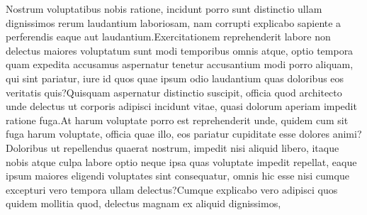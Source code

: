 \documentclass[letterpaper]{article} %
\begin{document}
Nostrum voluptatibus nobis ratione, incidunt porro sunt distinctio ullam dignissimos rerum laudantium laboriosam, nam corrupti explicabo sapiente a perferendis eaque aut laudantium.Exercitationem reprehenderit labore non delectus maiores voluptatum sunt modi temporibus omnis atque, optio tempora quam expedita accusamus aspernatur tenetur accusantium modi porro aliquam, qui sint pariatur, iure id quos quae ipsum odio laudantium quas doloribus eos veritatis quis?Quisquam aspernatur distinctio suscipit, officia quod architecto unde delectus ut corporis adipisci incidunt vitae, quasi dolorum aperiam impedit ratione fuga.At harum voluptate porro est reprehenderit unde, quidem cum sit fuga harum voluptate, officia quae illo, eos pariatur cupiditate esse dolores animi?Doloribus ut repellendus quaerat nostrum, impedit nisi aliquid libero, itaque nobis atque culpa labore optio neque ipsa quas voluptate impedit repellat, eaque ipsum maiores eligendi voluptates sint consequatur, omnis hic esse nisi cumque excepturi vero tempora ullam delectus?Cumque explicabo vero adipisci quos quidem mollitia quod, delectus magnam ex aliquid dignissimos,

\end{document}
